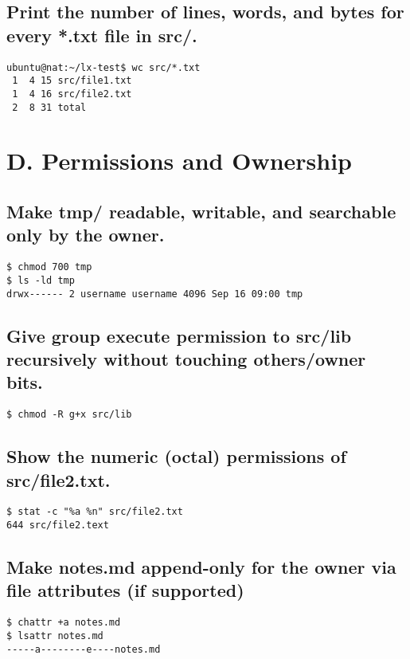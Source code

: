 \subsection{ Print the number of lines, words, and bytes for every *.txt file in src/.}
\begin{verbatim}
ubuntu@nat:~/lx-test$ wc src/*.txt
 1  4 15 src/file1.txt
 1  4 16 src/file2.txt
 2  8 31 total
\end{verbatim}

\section{D. Permissions and Ownership}
\subsection{Make tmp/ readable, writable, and searchable only by the owner.}
\begin{verbatim}
$ chmod 700 tmp
$ ls -ld tmp
drwx------ 2 username username 4096 Sep 16 09:00 tmp

\end{verbatim}

\subsection{ Give group execute permission to src/lib recursively without touching others/owner bits.}
\begin{verbatim}
$ chmod -R g+x src/lib

\end{verbatim}

\subsection{ Show the numeric (octal) permissions of src/file2.txt.}
\begin{verbatim}
$ stat -c "%a %n" src/file2.txt
644 src/file2.text
\end{verbatim}

\subsection{ Make notes.md append-only for the owner via file attributes (if supported)}
\begin{verbatim}
$ chattr +a notes.md
$ lsattr notes.md
-----a--------e----notes.md
\end{verbatim}

